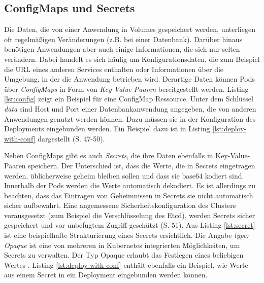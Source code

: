 \documentclass[11pt,a4paper]{article}
\begin{document}
\subsection{ConfigMaps und Secrets}
Die Daten, die von einer Anwendung in Volumes gespeichert werden, unterliegen oft regelmäßigen Veränderungen
(z.B. bei einer Datenbank). Darüber hinaus benötigen Anwendungen aber auch einige Informationen, die sich nur
selten verändern. Dabei handelt es sich häufig um Konfigurationsdaten, die zum Beispiel die URL eines anderen
Services enthalten oder Informationen über die Umgebung, in der die Anwendung betrieben wird.
Derartige Daten können Pods über \emph{ConfigMaps} in Form von \emph{Key-Value-Paaren} bereitgestellt werden.
Listing \ref{lst:config} zeigt ein Beispiel für eine ConfigMap Ressource.
Unter dem Schlüssel \emph{data} sind Host und Port einer Datenbankanwendung angegeben,
die von anderen Anwendungen genutzt werden können. Dazu müssen sie in der Konfiguration des
Deployments eingebunden werden. Ein Beispiel dazu ist in Listing \ref{lst:deploy-with-conf} dargestellt \cite{Schmeling_Dargatz_2022} (S. 47-50).




Neben ConfigMaps gibt es auch \emph{Secrets}, die ihre Daten ebenfalls in Key-Value-Paaren speichern.
Der Unterschied ist, dass die Werte, die in Secrets eingetragen werden, üblicherweise geheim bleiben sollen und
dass sie base64 \cite{rfc4648} kodiert sind. Innerhalb der Pods werden die Werte automatisch dekodiert.
Es ist allerdings zu beachten, dass das Eintragen von Geheimnissen in Secrets sie nicht automatisch sicher
aufbewahrt.
Eine angemessene Sicherheitskonfiguration des Clusters vorausgesetzt (zum Beispiel die Verschlüsselung des Etcd),
werden Secrets sicher gespeichert und vor unbefugtem Zugriff geschützt \cite{Schmeling_Dargatz_2022} (S. 51).
Aus Listing \ref{lst:secret} ist eine beispielhafte Strukturierung eines Secrets ersichtlich.
Die Angabe \emph{type: Opaque} ist eine von mehreren in Kubernetes integrierten Möglichkeiten,
um Secrets zu verwalten. Der Typ Opaque erlaubt das Festlegen eines beliebigen Wertes \cite{kubernetes.io_secret_types}.
Listing \ref{lst:deploy-with-conf} enthält ebenfalls ein Beispiel, wie Werte aus einem
Secret in ein Deployment eingebunden werden können.
\end{document}
